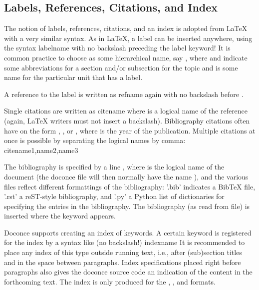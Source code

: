 \documentclass[twoside]{book}
\begin{document}
{\noindent

\subsection{Labels, References, Citations, and Index}

The notion of labels, references, citations, and an index is adopted
from {\LaTeX} with a very similar syntax. As in {\LaTeX}, a label can be
inserted anywhere, using the syntax
\bccq
label{name}
\eccq
with no backslash
preceding the label keyword! It is common practice to choose 
as some hierarchical name, say , where  and  indicate
some abbreviations for a section and/or subsection for the topic and
 is some name for the particular unit that has a label.

A reference to the label  is written as
\bccq
ref{name}
\eccq
again with no backslash before .

Single citations are written as
\bccq
cite{name}
\eccq
where  is a logical name
of the reference (again, {\LaTeX} writers must not insert a backslash).
Bibliography citations often have  on the form
, , or , where
 is the year of the publication.
Multiple citations at once is possible by separating the logical names
by comma:
\bccq
cite{name1,name2,name3}
\eccq

The bibliography is specified by a line , where  is the logical name of the
document (the doconce file will then normally have the name
), and the various files reflect different formattings of
the bibliography: '.bib' indicates a BibTeX file, '.rst' a reST-style
bibliography, and '.py' a Python list of dictionaries for specifying
the entries in the bibliography. The bibliography (as read from file)
is inserted where the  keyword appears.

Doconce supports creating an index of keywords. A certain keyword
is registered for the index by a syntax like (no
backslash!)
\bccq
index{name}
\eccq
It is recommended to place any index of this type outside
running text, i.e., after (sub)section titles and in the space between
paragraphs. Index specifications placed right before paragraphs also
gives the doconce source code an indication of the content in the
forthcoming text. The index is only produced for the , , and
 formats.

}
\end{document}

